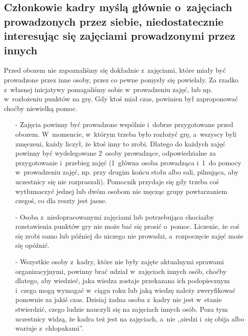 \subsection{Członkowie kadry myślą głównie o~zajęciach prowadzonych przez siebie, niedostatecznie interesując się zajęciami prowadzonymi przez innych}
Przed obozem nie zapoznaliśmy się dokładnie z~zajęciami, które miały być prowadzone przez inne osoby, przez co pewne pomysły się powielały. Za rzadko z~własnej inicjatywy pomagaliśmy sobie w~prowadzeniu zajęć, lub np. w~rozłożeniu punktów na grę. Gdy ktoś miał czas, powinien był zaproponować choćby niewielką pomoc.
\begin{itemize}
\item[-] Zajęcia powinny być prowadzone wspólnie i~dobrze przygotowane przed obozem. W~momencie, w~którym trzeba było rozłożyć grę, a~wszyscy byli zmęczeni, każdy liczył, że ktoś inny to zrobi. Dlatego do każdych zajęć powinny być wydelegowane 2~osoby prowadzące, odpowiedzialne za przygotowanie i~przebieg zajęć (1~główna osoba prowadząca i~1~do pomocy w~prowadzeniu zajęć, np. przy drugim końcu stołu albo sali, pilnująca, aby uczestnicy się nie rozpraszali). Pomocnik przydaje się gdy trzeba coś wytłumaczyć jednej lub dwóm osobom nie męcząc grupy powtarzaniem czegoś, co dla reszty jest jasne.
\item[-] Osoba z~niedopracowanymi zajęciami lub potrzebująca chociażby rozstawienia punktów gry nie może bać się prosić o~pomoc. Liczenie, że coś się zrobi samo lub później do niczego nie prowadzi, a~rozpoczęcie zajęć może się opóźnić.
\item[-] Wszystkie osoby z~kadry, które nie były zajęte aktualnymi sprawami organizacyjnymi, powinny brać udział w~zajęciach innych osób, choćby dlatego, aby wiedzieć, jaka wiedza zostaje przekazana ich podopiecznym i~czego mogą wymagać w~ciągu roku lub jaką wiedzę należy zweryfikować ponownie za jakiś czas. Dzisiaj żadna osoba z~kadry nie jest w~stanie stwierdzić, czego ludzie nauczyli się na zajęciach innych osób. Poza tym uczestnicy widzą, że kadra też jest na zajęciach, a~nie ,,siedzi i~się obija albo wariuje z~chłopakami''.
\end{itemize}
